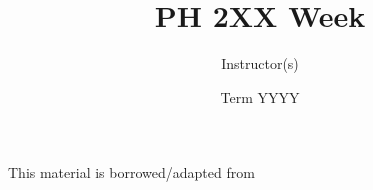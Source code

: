 \documentclass[]{article}
\title{PH 2XX Week \Week}
\author{Instructor(s)}
\date{Term YYYY}
\newcommand{\FileDepth}{../../..}
\begin{document}
\maketitle
\begin{center}
	This material is borrowed/adapted from
\end{center}



\end{document}
